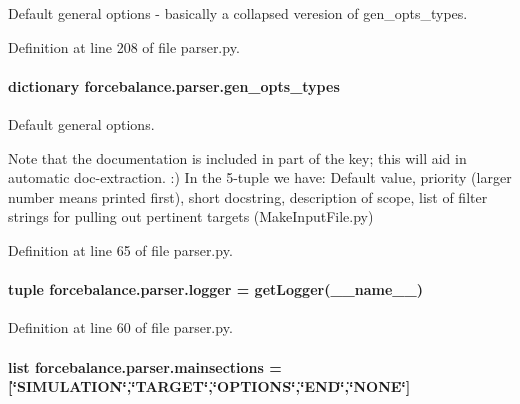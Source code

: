 Default general options -\/ basically a collapsed veresion of gen\-\_\-opts\-\_\-types. 



Definition at line 208 of file parser.\-py.

\hypertarget{namespaceforcebalance_1_1parser_a1ccdff008f4be5f63c068d2a592d69ab}{
\paragraph[{gen\-\_\-opts\-\_\-types}]{\setlength{\rightskip}{0pt plus 5cm}dictionary forcebalance.\-parser.\-gen\-\_\-opts\-\_\-types}}\label{namespaceforcebalance_1_1parser_a1ccdff008f4be5f63c068d2a592d69ab}


Default general options. 

Note that the documentation is included in part of the key; this will aid in automatic doc-\/extraction. \-:) In the 5-\/tuple we have\-: Default value, priority (larger number means printed first), short docstring, description of scope, list of filter strings for pulling out pertinent targets (Make\-Input\-File.\-py) 

Definition at line 65 of file parser.\-py.

\hypertarget{namespaceforcebalance_1_1parser_ab1a411e01f194a0a8fc51b5aaf4b05ac}{
\paragraph[{logger}]{\setlength{\rightskip}{0pt plus 5cm}tuple forcebalance.\-parser.\-logger = get\-Logger(\-\_\-\-\_\-name\-\_\-\-\_\-)}}\label{namespaceforcebalance_1_1parser_ab1a411e01f194a0a8fc51b5aaf4b05ac}


Definition at line 60 of file parser.\-py.

\hypertarget{namespaceforcebalance_1_1parser_a682a3870774181592a7a4784ab108ae6}{
\paragraph[{mainsections}]{\setlength{\rightskip}{0pt plus 5cm}list forcebalance.\-parser.\-mainsections = \mbox{[}\char`\"{}S\-I\-M\-U\-L\-A\-T\-I\-O\-N\char`\"{},\char`\"{}T\-A\-R\-G\-E\-T\char`\"{},\char`\"{}O\-P\-T\-I\-O\-N\-S\char`\"{},\char`\"{}E\-N\-D\char`\"{},\char`\"{}N\-O\-N\-E\char`\"{}\mbox{]}}}\label{namespaceforcebalance_1_1parser_a682a3870774181592a7a4784ab108ae6}


